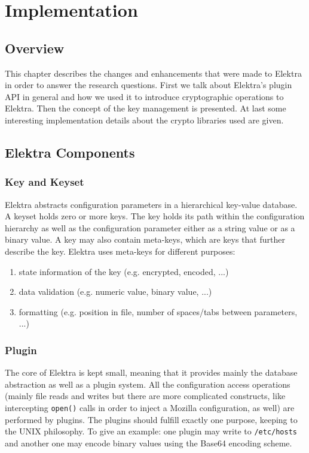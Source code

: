 \chapter{Implementation}

\section{Overview}

This chapter describes the changes and enhancements that were made to
Elektra in order to answer the research questions.
First we talk about Elektra's plugin API in general and how we used it
to introduce cryptographic operations to Elektra. Then the concept of
the key management is presented. At last some interesting implementation
details about the crypto libraries used are given.

\section{Elektra Components}\label{elektra-plugins}

\subsection{Key and Keyset}

Elektra abstracts configuration parameters in a hierarchical key-value database.
A keyset holds zero or more keys.
The key holds its path within the configuration hierarchy as well as the configuration parameter either as a string value or as a binary value.
A key may also contain meta-keys, which are keys that further describe the key.
Elektra uses meta-keys for different purposes:

\begin{enumerate}
\item state information of the key (e.g. encrypted, encoded, ...)
\item data validation (e.g. numeric value, binary value, ...)
\item formatting (e.g. position in file, number of spaces/tabs between parameters, ...)
\end{enumerate}

\subsection{Plugin}

The core of Elektra is kept small, meaning that it provides mainly the database abstraction as well as a plugin system.
All the configuration access operations (mainly file reads and writes but there are more complicated constructs, like intercepting \texttt{open()} calls in order to inject a Mozilla configuration, as well) are performed by plugins.
The plugins should fulfill exactly one purpose, keeping to the UNIX philosophy.
To give an example: one plugin may write to \texttt{/etc/hosts} and another one may encode binary values using the Base64 encoding scheme.

